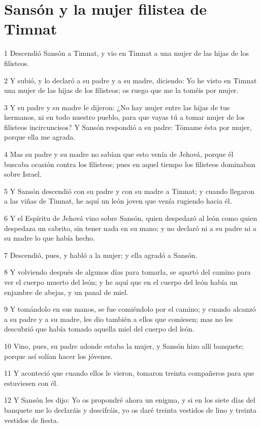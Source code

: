 \section*{Sansón y la mujer filistea de Timnat}

\par 1 Descendió Sansón a Timnat, y vio en Timnat a una mujer de las hijas de los filisteos.
\par 2 Y subió, y lo declaró a su padre y a su madre, diciendo: Yo he visto en Timnat una mujer de las hijas de los filisteos; os ruego que me la toméis por mujer.
\par 3 Y su padre y su madre le dijeron: ¿No hay mujer entre las hijas de tus hermanos, ni en todo nuestro pueblo, para que vayas tú a tomar mujer de los filisteos incircuncisos? Y Sansón respondió a su padre: Tómame ésta por mujer, porque ella me agrada.
\par 4 Mas su padre y su madre no sabían que esto venía de Jehová, porque él buscaba ocasión contra los filisteos; pues en aquel tiempo los filisteos dominaban sobre Israel.
\par 5 Y Sansón descendió con su padre y con su madre a Timnat; y cuando llegaron a las viñas de Timnat, he aquí un león joven que venía rugiendo hacia él.
\par 6 Y el Espíritu de Jehová vino sobre Sansón, quien despedazó al león como quien despedaza un cabrito, sin tener nada en su mano; y no declaró ni a su padre ni a su madre lo que había hecho.
\par 7 Descendió, pues, y habló a la mujer; y ella agradó a Sansón.
\par 8 Y volviendo después de algunos días para tomarla, se apartó del camino para ver el cuerpo muerto del león; y he aquí que en el cuerpo del león había un enjambre de abejas, y un panal de miel.
\par 9 Y tomándolo en sus manos, se fue comiéndolo por el camino; y cuando alcanzó a su padre y a su madre, les dio también a ellos que comiesen; mas no les descubrió que había tomado aquella miel del cuerpo del león.
\par 10 Vino, pues, su padre adonde estaba la mujer, y Sansón hizo allí banquete; porque así solían hacer los jóvenes.
\par 11 Y aconteció que cuando ellos le vieron, tomaron treinta compañeros para que estuviesen con él.
\par 12 Y Sansón les dijo: Yo os propondré ahora un enigma, y si en los siete días del banquete me lo declaráis y descifráis, yo os daré treinta vestidos de lino y treinta vestidos de fiesta.
